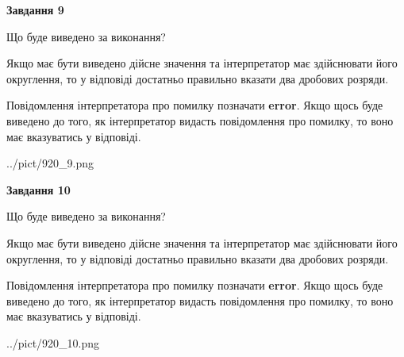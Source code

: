 \documentclass[12pt, ukrainian]{article}
\begin{document}
{\begin {Large}
{\begin {center}\textbf{Завдання 9}\end {center}}\par
Що буде виведено за виконання? \par

Якщо має бути виведено дійсне значення та інтерпретатор має здійснювати його округлення, 
то у відповіді достатньо правильно вказати два дробових розряди.

Повідомлення інтерпретатора про помилку позначати \textbf{error}.
Якщо щось буде виведено до того, як інтерпретатор видасть повідомлення про помилку, 
то воно має вказуватись у відповіді. \par

\begin{center}
	{../pict/920_9.png}
\end{center}
\newpage

{\begin {center}\textbf{Завдання 10}\end {center}}\par
Що буде виведено за виконання? \par

Якщо має бути виведено дійсне значення та інтерпретатор має здійснювати його округлення, 
то у відповіді достатньо правильно вказати два дробових розряди.

Повідомлення інтерпретатора про помилку позначати \textbf{error}.
Якщо щось буде виведено до того, як інтерпретатор видасть повідомлення про помилку, 
то воно має вказуватись у відповіді. \par

\begin{center}
	{../pict/920_10.png}
\end{center}
\newpage

\end {Large}}
\end{document}
